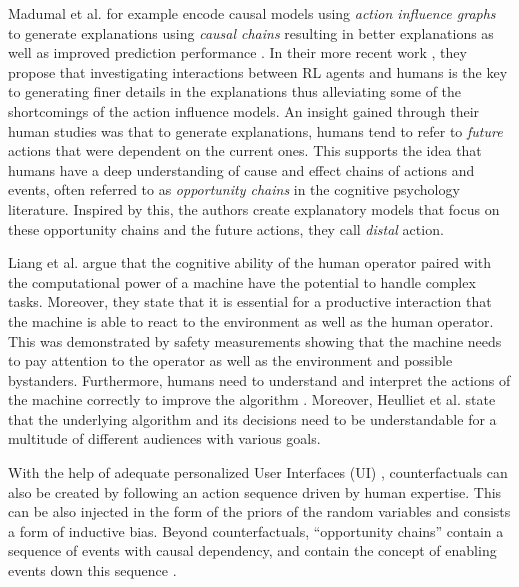 \documentclass[twoside,11pt]{article}
\begin{document}
Madumal et al. for example encode causal models using \emph{action influence graphs} to generate explanations using \emph{causal chains} resulting in better explanations as well as improved prediction performance \cite{MadumalEtAl:2020:CausalRLCFs}. In their more recent work \cite{Madumal:2020:DistalEF}, they propose that investigating interactions between RL agents and humans is the key to generating finer details in the explanations thus alleviating some of the shortcomings of the action influence models. An insight gained through their human studies was that to generate explanations, humans tend to refer to \emph{future} actions that were dependent on the current ones. This supports the idea that humans have a deep understanding of cause and effect chains of actions and events, often referred to as \emph{opportunity chains} in the cognitive psychology literature. Inspired by this, the authors create explanatory models that focus on these opportunity chains and the future actions, they call \emph{distal} action. 

Liang et al. \cite{LiangEtAl:2017:HITLReinforcementLearn} argue that the cognitive ability of the human operator paired with the computational power of a machine have the potential to handle complex tasks. Moreover, they state that it is essential for a productive interaction that the machine is able to react to the environment as well as the human operator. This was demonstrated by safety measurements showing that the machine needs to pay attention to the operator as well as the environment and possible bystanders. Furthermore, humans need to understand and interpret the actions of the machine correctly to improve the algorithm \cite{heuillet2021explainability}. Moreover, Heulliet et al. \cite{heuillet2021explainability} state that the underlying algorithm and its decisions need to be understandable for a multitude of different audiences with various goals.


With the help of adequate personalized User Interfaces (UI) \cite{Sun:2021:TopologyPerturbationGNNs}, counterfactuals can also be created by following an action sequence driven by human expertise. This can be also injected in the form of the priors of the random variables and consists a form of inductive bias.
Beyond counterfactuals, ``opportunity chains'' contain a sequence of events with causal dependency, and contain the concept of enabling events down this sequence \cite{Madumal:2020:DistalEF}.
\end{document}
